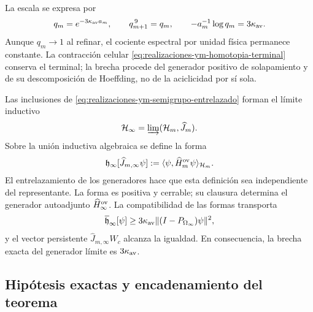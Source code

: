 La escala se expresa por
\begin{equation}\label{eq:realizaciones-ym-qm}
 q_m=e^{-3\kappa_{\rm av}a_m},
 \qquad q_{m+1}^{\,9}=q_m,
 \qquad -a_m^{-1}\log q_m=3\kappa_{\rm av}.
\end{equation}
Aunque \(q_m\to1\) al refinar, el cociente espectral por unidad física
permanece constante. La contracción celular
\eqref{eq:realizaciones-ym-homotopia-terminal} conserva el terminal; la
brecha procede del generador positivo de solapamiento y de su descomposición de
Hoeffding, no de la aciclicidad por sí sola.

Las inclusiones de \eqref{eq:realizaciones-ym-semigrupo-entrelazado}
forman el límite inductivo
\begin{equation}\label{eq:realizaciones-ym-colimite}
 \mathcal H_\infty=\varinjlim(\mathcal H_m,\widehat J_m).
\end{equation}
Sobre la unión inductiva algebraica se define la forma
\begin{equation}\label{eq:realizaciones-ym-forma-limite}
 \mathfrak h_\infty[\widehat J_{m,\infty}\psi]
 :=\langle\psi,\widehat H_m^{\rm ov}\psi\rangle_{\mathcal H_m}.
\end{equation}
El entrelazamiento de los generadores hace que esta definición sea
independiente del representante. La forma es positiva y cerrable; su
clausura determina el generador autoadjunto \(\widehat H_\infty^{\rm ov}\).
La compatibilidad de las formas transporta
\begin{equation}\label{eq:realizaciones-ym-gap-forma-limite}
 \overline{\mathfrak h}_\infty[\psi]
 \geq3\kappa_{\rm av}
 \|(I-P_{\Omega_\infty})\psi\|^2,
\end{equation}
y el vector persistente
\(\widehat J_{m,\infty}W_c\) alcanza la igualdad. En consecuencia, la
brecha exacta del generador límite es \(3\kappa_{\rm av}\).

\subsection*{Hipótesis exactas y encadenamiento del teorema}

